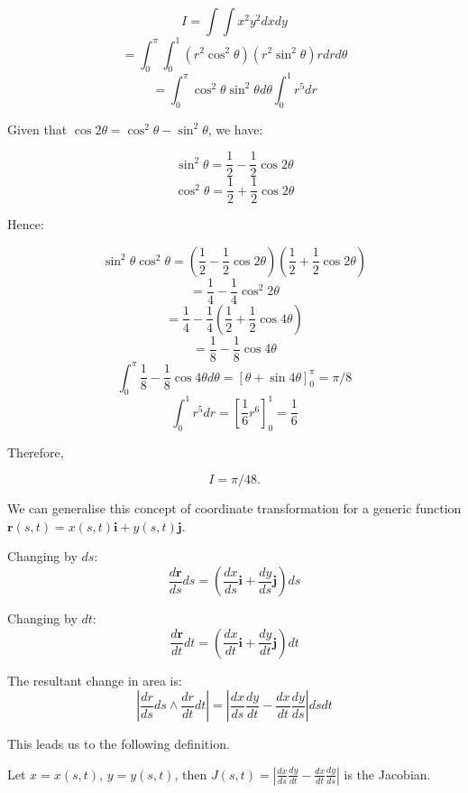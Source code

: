 \documentclass[a4paper,10pt]{article}
\begin{document}
\begin{ex}
	\[ I = \int \int x^2 y^2 dxdy \]
	\[ = \int_0^{\pi} \int_0^1 (r^2 \cos^2\theta)(r^2 \sin^2\theta)
	rdrd\theta \]
	\[ = \int_0^{\pi} \cos^2\theta \sin^2\theta d\theta
	\int_0^1 r^5 dr \]

	Given that $\cos2\theta = \cos^2\theta - \sin^2\theta$, we have:

	\[ \sin^2\theta = \frac{1}{2} - \frac{1}{2} \cos2\theta \]
	\[ \cos^2\theta = \frac{1}{2} + \frac{1}{2} \cos2\theta \]

	Hence:

	\[
		\sin^2\theta \cos^2\theta =
		(\frac{1}{2} - \frac{1}{2} \cos2\theta)
		(\frac{1}{2} + \frac{1}{2} \cos2\theta)
	\]
	\[
		= \frac{1}{4} - \frac{1}{4} \cos^2 2\theta
	\]
	\[
		= \frac{1}{4} - \frac{1}{4}
		(\frac{1}{2} + \frac{1}{2} \cos4\theta)
	\]
	\[
		= \frac{1}{8} - \frac{1}{8} \cos4\theta
	\]
	\[
		\int_0^{\pi} \frac{1}{8} - \frac{1}{8} \cos4\theta d\theta =
		\left[ \theta + \sin4\theta \right]_0^{\pi} = \pi/8
	\]
	\[
		\int_0^1 r^5 dr = \left[ \frac{1}{6} r^6 \right]_0^1
		= \frac{1}{6}
	\]

	Therefore,

	\[ I = \pi/48. \]

\end{ex}

We can generalise this concept of coordinate transformation for a
generic function
$ \mathbf{r} (s,t) = x(s,t)\mathbf{i} + y(s,t)\mathbf{j}$.

Changing by $ds$:
\[
	\frac{d\mathbf{r}}{ds} ds =
	\left( \frac{dx}{ds}\mathbf{i} + \frac{dy}{ds}\mathbf{j} \right) ds
\]

Changing by $dt$:
\[
	\frac{d\mathbf{r}}{dt} dt =
	\left( \frac{dx}{dt}\mathbf{i} + \frac{dy}{dt}\mathbf{j} \right) dt
\]

The resultant change in area is:
\[
	| \frac{dr}{ds}ds \wedge \frac{dr}{dt}dt |
	= | \frac{dx}{ds}\frac{dy}{dt} - \frac{dx}{dt}\frac{dy}{ds} | dsdt
\]

This leads us to the following definition.

\begin{defn}[Jacobian]
	Let $x = x(s,t)$, $y = y(s,t)$, then
	$J(s,t) = |\frac{dx}{ds}\frac{dy}{dt} - \frac{dx}{dt}\frac{dy}{ds}|$
	is the Jacobian.
\end{defn}
\end{document}
